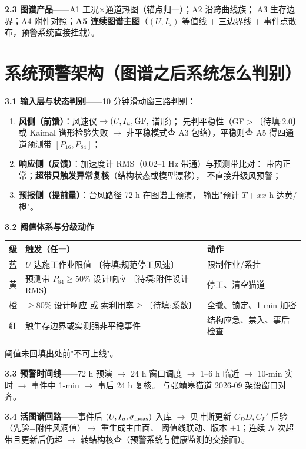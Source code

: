 \documentclass[11pt,a4paper]{ctexart}
\newcommand{\tofill}[1]{\textcolor{red!60!black}{〔待填:#1〕}}
\begin{document}
\textbf{2.3 图谱产品}——A1 工况$\times$通道热图（锚点归一）；A2 沿跨曲线族；
A3 生存边界；A4 附件对照；\textbf{A5 连续图谱主图}（$(U,I_u)$ 等值线 +
三边界线 + 事件点散布，预警系统直接挂载）。

\section{系统预警架构（图谱之后系统怎么判别）}

\textbf{3.1 输入层与状态判别}——10 分钟滑动窗三路判别：
\begin{enumerate}
  \item \textbf{风侧（前馈）}：风速仪 $\to (U, I_u, {\rm GF},$ 谱形$)$；
        先判平稳性（GF$>$\tofill{2.0} 或 Kaimal 谱形检验失败 $\to$
        非平稳模式查 A3 包络），平稳则查 A5 得四通道预测带 $[P_{16},P_{84}]$；
  \item \textbf{响应侧（反馈）}：加速度计 RMS（0.02--1 Hz 带通）与预测带比对：
        带内正常；\textbf{超带只触发异常复核}（结构状态或模型漂移），
        不直接升级风预警；
  \item \textbf{预报侧（提前量）}：台风路径 72 h 在图谱上预演，
        输出"预计 $T{+}xx$ h 达黄/橙"。
\end{enumerate}

\textbf{3.2 阈值体系与分级动作}
\begin{center}\small
\begin{tabular}{lll}
\toprule
级 & 触发（任一） & 动作\\
\midrule
蓝 & $U$ 达施工作业限值 \tofill{规范停工风速} & 限制作业/系挂\\
黄 & 预测带 $P_{84}\ge 50\%$ 设计响应 \tofill{附件设计RMS} & 停工、清空猫道\\
橙 & $\ge 80\%$ 设计响应 或 索利用率$\ge$\tofill{系数} & 全撤、锁定、1-min 加密\\
红 & 触生存边界或实测强非平稳事件 & 结构应急、禁入、事后检查\\
\bottomrule
\end{tabular}
\end{center}
阈值未回填出处前"不可上线"。

\textbf{3.3 预警时间线}——72 h 预演 $\to$ 24 h 窗口调度 $\to$ 1--6 h 临近
$\to$ 10-min 实时 $\to$ 事件中 1-min $\to$ 事后 24 h 复核。
与张靖皋猫道 2026-09 架设窗口对齐。

\textbf{3.4 活图谱回路}——事件后 $(U,I_u,\sigma_{\rm meas})$ 入库 $\to$
贝叶斯更新 $C_D D, C_L'$ 后验（先验=附件风洞值）$\to$ 重生成主曲面、
阈值线联动、版本 $+1$；连续 $N$ 次超带且更新后仍超 $\to$
转结构核查（预警系统与健康监测的交接面）。
\end{document}

